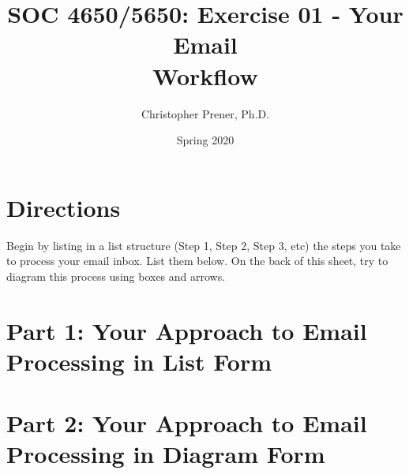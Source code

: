 \documentclass{tufte-handout}
\title{SOC 4650/5650: Exercise 01 - Your Email \\Workflow}
\author{Christopher Prener, Ph.D.}
\date{Spring 2020}
\begin{document}
\maketitle %

\vspace{5mm}
\section{Directions}
Begin by listing in a list structure (Step 1, Step 2, Step 3, etc) the steps you take to process your email inbox. List them below. On the back of this sheet, try to diagram this process using boxes and arrows.

\vspace{5mm}
\section{Part 1: Your Approach to Email Processing in List Form}

\newpage
\section{Part 2: Your Approach to Email Processing in Diagram Form}

\end{document}
